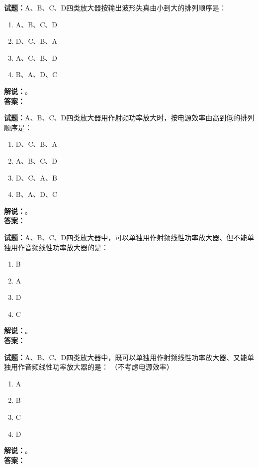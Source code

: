 \documentclass{ctexbook}
\begin{document}
\bigskip




\noindent\textbf{试题：}A、B、C、D四类放大器按输出波形失真由小到大的排列顺序是：
\begin{enumerate}[leftmargin=3em]
\item A、B、C、D
\item D、C、B、A
\item A、C、B、D
\item B、A、D、C
\end{enumerate}
\noindent\textbf{解说：}\textbf{}。\\\noindent\textbf{答案：}

\bigskip




\noindent\textbf{试题：}A、B、C、D四类放大器用作射频功率放大时，按电源效率由高到低的排列顺序是：
\begin{enumerate}[leftmargin=3em]
\item D、C、B、A
\item A、B、C、D
\item D、C、A、B
\item B、A、D、C
\end{enumerate}
\noindent\textbf{解说：}\textbf{}。\\\noindent\textbf{答案：}

\bigskip




\noindent\textbf{试题：}A、B、C、D四类放大器中，可以单独用作射频线性功率放大器、但不能单独用作音频线性功率放大器的是：
\begin{enumerate}[leftmargin=3em]
\item B
\item A
\item D
\item C
\end{enumerate}
\noindent\textbf{解说：}\textbf{}。\\\noindent\textbf{答案：}

\bigskip




\noindent\textbf{试题：}A、B、C、D四类放大器中，既可以单独用作射频线性功率放大器、又能单独用作音频线性功率放大器的是： （不考虑电源效率）
\begin{enumerate}[leftmargin=3em]
\item A
\item B
\item C
\item D
\end{enumerate}
\noindent\textbf{解说：}\textbf{}。\\\noindent\textbf{答案：}
\end{document}
